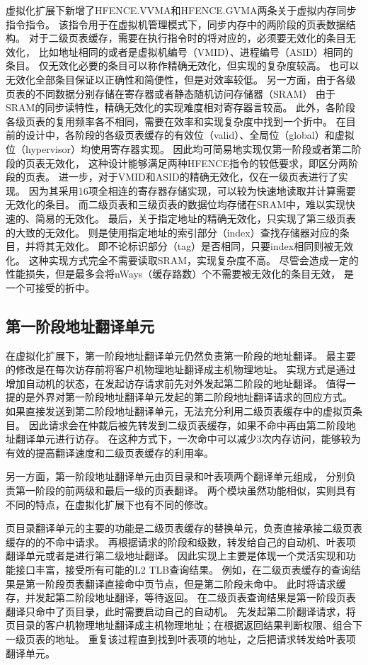 虚拟化扩展下新增了HFENCE.VVMA和HFENCE.GVMA两条关于虚拟内存同步指令指令。
该指令用于在虚拟机管理模式下，同步内存中的两阶段的页表数据结构。
对于二级页表缓存，需要在执行指令时的将对应的，必须要无效化的条目无效化，
比如地址相同的或者是虚拟机编号（VMID）、进程编号（ASID）相同的条目。
仅无效化必要的条目可以称作精确无效化，但实现的复杂度较高。
也可以无效化全部条目保证以正确性和简便性，但是对效率较低。
另一方面，由于各级页表的不同数据分别存储在寄存器或者静态随机访问存储器（SRAM）
由于SRAM的同步读特性，精确无效化的实现难度相对寄存器言较高。
此外，各阶段各级页表的复用频率各不相同，需要在效率和实现复杂度中找到一个折中。
在目前的设计中，各阶段的各级页表缓存的有效位（valid）、全局位（global）和虚拟位（hypervisor）均使用寄存器实现。
因此均可简易地实现仅第一阶段或者第二阶段的页表无效化，
这种设计能够满足两种HFENCE指令的较低要求，即区分两阶段的页表。
进一步，对于VMID和ASID的精确无效化，仅在一级页表进行了实现。
因为其采用16项全相连的寄存器存储实现，可以较为快速地读取并计算需要无效化的条目。
而二级页表和三级页表的数据位均存储在SRAM中，难以实现快速的、简易的无效化。
最后，关于指定地址的精确无效化，只实现了第三级页表的大致的无效化。
则是使用指定地址的索引部分（index）查找存储器对应的条目，并将其无效化。
即不论标识部分（tag）是否相同，只要index相同则被无效化。
这种实现方式完全不需要读取SRAM，实现复杂度不高。
尽管会造成一定的性能损失，但是最多会将nWays（缓存路数）个不需要被无效化的条目无效，
是一个可接受的折中。

\subsection{第一阶段地址翻译单元}
在虚拟化扩展下，第一阶段地址翻译单元仍然负责第一阶段的地址翻译。
最主要的修改是在每次访存前将客户机物理地址翻译成主机物理地址。
实现方式是通过增加自动机的状态，在发起访存请求前先对外发起第二阶段的地址翻译。
值得一提的是外界对第一阶段地址翻译单元发起的第二阶段地址翻译请求的回应方式。
如果直接发送到第二阶段地址翻译单元，无法充分利用二级页表缓存中的虚拟页条目。
因此请求会在仲裁后被先转发到二级页表缓存，如果不命中再由第二阶段地址翻译单元进行访存。
在这种方式下，一次命中可以减少3次内存访问，能够较为有效的提高翻译速度和二级页表缓存的利用率。

另一方面，第一阶段地址翻译单元由页目录和叶表项两个翻译单元组成，
分别负责第一阶段的前两级和最后一级的页表翻译。
两个模块虽然功能相似，实则具有不同的特点，在虚拟化扩展下也有不同的修改。

页目录翻译单元的主要的功能是二级页表缓存的替换单元，负责直接承接二级页表缓存的的不命中请求。
再根据请求的阶段和级数，转发给自己的自动机、叶表项翻译单元或者是进行第二级地址翻译。
因此实现上主要是体现一个灵活实现和功能接口丰富，接受所有可能的L2 TLB查询结果。
例如，在二级页表缓存的查询结果是第一阶段页表翻译直接命中页节点，但是第二阶段未命中。
此时将请求缓存，并发起第二阶段地址翻译，等待返回。
在二级页表查询结果是第一阶段页表翻译只命中了页目录，此时需要启动自己的自动机。
先发起第二阶翻译请求，将页目录的客户机物理地址翻译成主机物理地址；在根据返回结果判断权限、组合下一级页表的地址。
重复该过程直到找到叶表项的地址，之后把请求转发给叶表项翻译单元。

